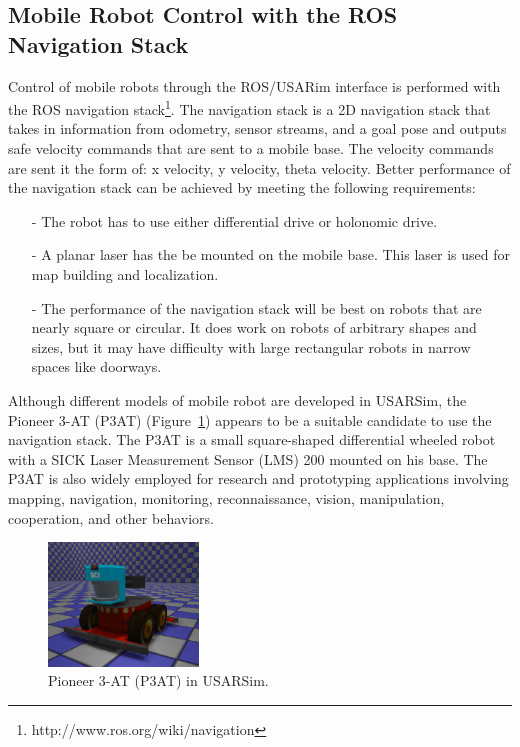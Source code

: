 \subsection*{Mobile Robot Control with the ROS Navigation Stack}
Control of mobile robots through the ROS/USARim interface is performed with the ROS navigation stack\footnote{http://www.ros.org/wiki/navigation}. The navigation stack is a 2D navigation stack that takes in information from odometry, sensor streams, and a goal pose and outputs safe velocity commands that are sent to a mobile base. The velocity commands are sent it the form of: x velocity, y velocity, theta velocity. Better performance of the navigation stack can be achieved by meeting the following requirements:
\begin{itemize}
\item[-] The robot has to use either differential drive or holonomic drive.
\item[-] A planar laser has the be mounted on the mobile base. This laser is used for map building and localization.
\item[-] The performance of the navigation stack will be best on robots that are nearly square or circular. It does work on robots of arbitrary shapes and sizes, but it may have difficulty with large rectangular robots in narrow spaces like doorways.
\end{itemize}

Although different models of mobile robot are developed in USARSim, the Pioneer 3-AT (P3AT) (Figure~\ref{fig:p3at}) appears to be a suitable candidate to use the navigation stack. The P3AT is a small square-shaped differential wheeled robot with a SICK Laser Measurement Sensor (LMS) 200 mounted on his base. The P3AT is also widely employed for research and prototyping applications involving mapping, navigation, monitoring, reconnaissance, vision, manipulation, cooperation, and other behaviors.

\begin{figure}[t!]
\centering
\includegraphics[width=4cm]{Figures/Robots/P3AT.eps}
\caption{Pioneer 3-AT (P3AT) in USARSim.}\label{fig:p3at}
\end{figure}




